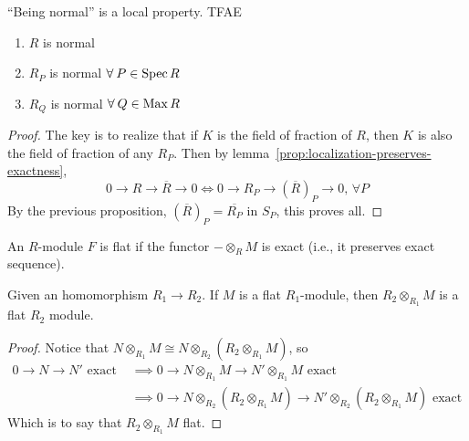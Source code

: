 \begin{prop}
  ``Being normal'' is a local property. TFAE
  \begin{enumerate}[(1)]
    \item $R$ is normal
    \item $R_P$ is normal $\forall P \in \Spec R$
    \item $R_Q$ is normal $\forall Q \in \Max R$
  \end{enumerate}

  \begin{proof}
    The key is to realize that if $K$ is the field of fraction of $R$,
    then $K$ is also the field of fraction of any $R_P$. Then by
    lemma~\ref{prop:localization-preserves-exactness},
    \[ 0 \to R \to \overline{R} \to 0 \iff 0 \to R_P \to (\overline{R})_P \to 0, \, \forall P \]
    By the previous proposition, $(\overline{R})_P = \overline{R_P}$ in $S_P$, this proves all.
  \end{proof}
\end{prop}

\begin{definition}
  An $R$-module $F$ is  flat if the functor
  ${-} \otimes_R M$ is exact (i.e., it preserves exact sequence).
\end{definition}

\begin{prop}
  Given an homomorphism $R_1 \to R_2$.
  If $M$ is a flat $R_1$-module, then $R_2 \otimes_{R_1} M$ is a flat $R_2$ module.

  \begin{proof}
    Notice that $N \otimes_{R_1} M \cong N \otimes_{R_2} (R_2 \otimes_{R_1} M)$,
    so
    \begin{align*}
      0 \to N \to N' \text{ exact }
      &\implies 0 \to N \otimes_{R_1} M \to N' \otimes_{R_1} M \text{ exact } \\
      &\implies 0 \to N \otimes_{R_2} (R_2 \otimes_{R_1} M)
      \to N' \otimes_{R_2} (R_2 \otimes_{R_1} M) \text{ exact }
    \end{align*}
    Which is to say that $R_2 \otimes_{R_1} M$ flat.
  \end{proof}
\end{prop}

